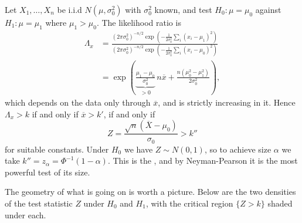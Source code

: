 \documentclass[a4paper]{scrartcl}
\begin{document}
\begin{example}
  Let $X_1, \dots, X_n$ be i.i.d $N(\mu, \sigma_0^2)$ with $\sigma_0^2$ known, and test $H_0 : \mu = \mu_0$ against $H_1 : \mu = \mu_1$ where $\mu_1 > \mu_0$. The likelihood ratio is
  \begin{align*}
    \Lambda_x &= \frac{(2\pi\sigma_0^2)^{-n/2}\exp\left(-\frac{1}{2\sigma_0^2}\sum_i(x_i - \mu_1)^2\right)}{(2\pi\sigma_0^2)^{-n/2}\exp\left(-\frac{1}{2\sigma_0^2}\sum_i(x_i - \mu_0)^2\right)}\\
    &= \exp\left(\underbrace{\frac{\mu_1 - \mu_0}{\sigma_0^2}}_{> 0}\, n\overline{x} + \frac{n(\mu_0^2 - \mu_1^2)}{2\sigma_0^2}\right),
  \end{align*}
  which depends on the data only through $\overline{x}$, and is strictly increasing in it. Hence $\Lambda_x > k$ if and only if $\overline{x} > k'$, if and only if
  $$
  Z = \frac{\sqrt{n}\left(\overline{X} - \mu_0\right)}{\sigma_0} > k''
  $$
  for suitable constants. Under $H_0$ we have $Z \sim N(0,1)$, so to achieve size $\alpha$ we take $k'' = z_\alpha = \Phi^{-1}(1-\alpha)$. This is the , and by Neyman-Pearson it is the most powerful test of its size.
\end{example}

The geometry of what is going on is worth a picture. Below are the two densities of the test statistic $Z$ under $H_0$ and $H_1$, with the critical region $\{Z > k\}$ shaded under each.
\end{document}
